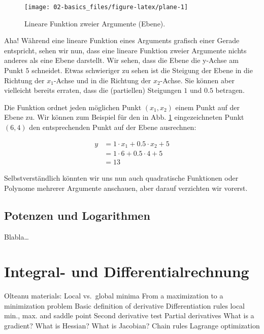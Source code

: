 \documentclass[
]{book}
\begin{document}
\begin{figure}

{\centering \texttt{[image: 02-basics\_files/figure-latex/plane-1]} 

}

\caption{Lineare Funktion zweier Argumente (Ebene).}\label{fig:plane}
\end{figure}

Aha! Während eine lineare Funktion eines Arguments grafisch einer Gerade entspricht, sehen wir nun, dass eine lineare Funktion zweier Argumente nichts anderes als eine Ebene darstellt. Wir sehen, dass die Ebene die y-Achse am Punkt \(5\) schneidet. Etwas schwieriger zu sehen ist die Steigung der Ebene in die Richtung der \(x_1\)-Achse und in die Richtung der \(x_2\)-Achse. Sie können aber vielleicht bereits erraten, dass die (partiellen) Steigungen \(1\) und \(0.5\) betragen.

Die Funktion ordnet jeden möglichen Punkt \((x_1,x_2)\) einem Punkt auf der Ebene zu. Wir können zum Beispiel für den in Abb. \ref{fig:plane} eingezeichneten Punkt \((6,4)\) den entsprechenden Punkt auf der Ebene ausrechnen:

\[ \begin{split}
y &= 1 \cdot x_1 + 0.5 \cdot x_2 + 5\\
&= 1 \cdot 6 + 0.5 \cdot 4 + 5\\
&= 13
\end{split}\]

Selbstverständlich könnten wir uns nun auch quadratische Funktionen oder Polynome mehrerer Argumente anschauen, aber darauf verzichten wir vorerst.

\hypertarget{potenzen-und-logarithmen}{%
\subsection{Potenzen und Logarithmen}\label{potenzen-und-logarithmen}}

Blabla\ldots{}

\hypertarget{integral--und-differentialrechnung}{%
\section{Integral- und Differentialrechnung}\label{integral--und-differentialrechnung}}

Olteanu materials:
Local vs.~global minima
From a maximization to a minimization problem
Basic definition of derivative
Differentiation rules
local min., max. and saddle point
Second derivative test
Partial derivatives
What is a gradient? What is Hessian? What is Jacobian?
Chain rules
Lagrange optimization
\end{document}
